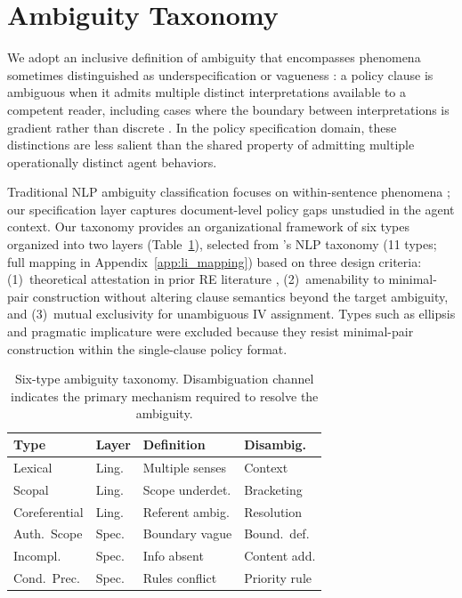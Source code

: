 \section{Ambiguity Taxonomy}
\label{sec:taxonomy}

We adopt an inclusive definition of ambiguity that encompasses phenomena sometimes distinguished as underspecification or vagueness \citep{poesio_artstein_2005,vandeemter_semantic_1996}: a policy clause is ambiguous when it admits multiple distinct interpretations available to a competent reader, including cases where the boundary between interpretations is gradient rather than discrete \citep{wasow_ambiguity_2005,kennedy_vagueness_2007}. In the policy specification domain, these distinctions are less salient than the shared property of admitting multiple operationally distinct agent behaviors.

Traditional NLP ambiguity classification focuses on within-sentence phenomena \citep{wasow_ambiguity_2005}; our specification layer captures document-level policy gaps unstudied in the agent context. Our taxonomy provides an organizational framework of six types organized into two layers (Table~\ref{tab:taxonomy}), selected from \citet{li_ambiguity_taxonomy_2024}'s NLP taxonomy (11 types; full mapping in Appendix~\ref{app:li_mapping}) based on three design criteria: (1)~theoretical attestation in prior RE literature \citep{massey_ambiguity_re_2014,berry_kamsties_2004,drip_r_2026}, (2)~amenability to minimal-pair construction without altering clause semantics beyond the target ambiguity, and (3)~mutual exclusivity for unambiguous IV assignment. Types such as ellipsis and pragmatic implicature were excluded because they resist minimal-pair construction within the single-clause policy format.

\begin{table}[t]
\centering
\small
\caption{Six-type ambiguity taxonomy. Disambiguation channel indicates the primary mechanism required to resolve the ambiguity.}
\label{tab:taxonomy}
\setlength{\tabcolsep}{3pt}
\begin{tabular}{@{}llll@{}}
\toprule
\textbf{Type} & \textbf{Layer} & \textbf{Definition} & \textbf{Disambig.} \\
\midrule
Lexical & Ling. & Multiple senses & Context \\
Scopal & Ling. & Scope underdet. & Bracketing \\
Coreferential & Ling. & Referent ambig. & Resolution \\
Auth.\ Scope & Spec. & Boundary vague & Bound.\ def. \\
Incompl. & Spec. & Info absent & Content add. \\
Cond.\ Prec. & Spec. & Rules conflict & Priority rule \\
\bottomrule
\end{tabular}
\end{table}

